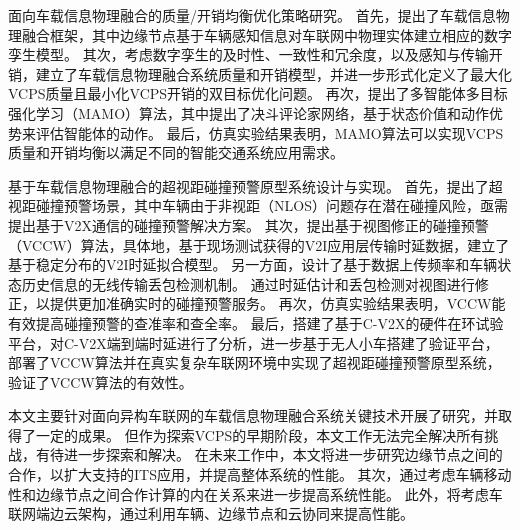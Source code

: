  面向车载信息物理融合的质量/开销均衡优化策略研究。
首先，提出了车载信息物理融合框架，其中边缘节点基于车辆感知信息对车联网中物理实体建立相应的数字孪生模型。
其次，考虑数字孪生的及时性、一致性和冗余度，以及感知与传输开销，建立了车载信息物理融合系统质量和开销模型，并进一步形式化定义了最大化VCPS质量且最小化VCPS开销的双目标优化问题。
再次，提出了多智能体多目标强化学习（MAMO）算法，其中提出了决斗评论家网络，基于状态价值和动作优势来评估智能体的动作。
最后，仿真实验结果表明，MAMO算法可以实现VCPS质量和开销均衡以满足不同的智能交通系统应用需求。

 基于车载信息物理融合的超视距碰撞预警原型系统设计与实现。
首先，提出了超视距碰撞预警场景，其中车辆由于非视距（NLOS）问题存在潜在碰撞风险，亟需提出基于V2X通信的碰撞预警解决方案。
其次，提出基于视图修正的碰撞预警（VCCW）算法，具体地，基于现场测试获得的V2I应用层传输时延数据，建立了基于稳定分布的V2I时延拟合模型。
另一方面，设计了基于数据上传频率和车辆状态历史信息的无线传输丢包检测机制。
通过时延估计和丢包检测对视图进行修正，以提供更加准确实时的碰撞预警服务。
再次，仿真实验结果表明，VCCW能有效提高碰撞预警的查准率和查全率。
最后，搭建了基于C-V2X的硬件在环试验平台，对C-V2X端到端时延进行了分析，进一步基于无人小车搭建了验证平台，部署了VCCW算法并在真实复杂车联网环境中实现了超视距碰撞预警原型系统，验证了VCCW算法的有效性。

本文主要针对面向异构车联网的车载信息物理融合系统关键技术开展了研究，并取得了一定的成果。
但作为探索VCPS的早期阶段，本文工作无法完全解决所有挑战，有待进一步探索和解决。
在未来工作中，本文将进一步研究边缘节点之间的合作，以扩大支持的ITS应用，并提高整体系统的性能。
其次，通过考虑车辆移动性和边缘节点之间合作计算的内在关系来进一步提高系统性能。
此外，将考虑车联网端边云架构，通过利用车辆、边缘节点和云协同来提高性能。
